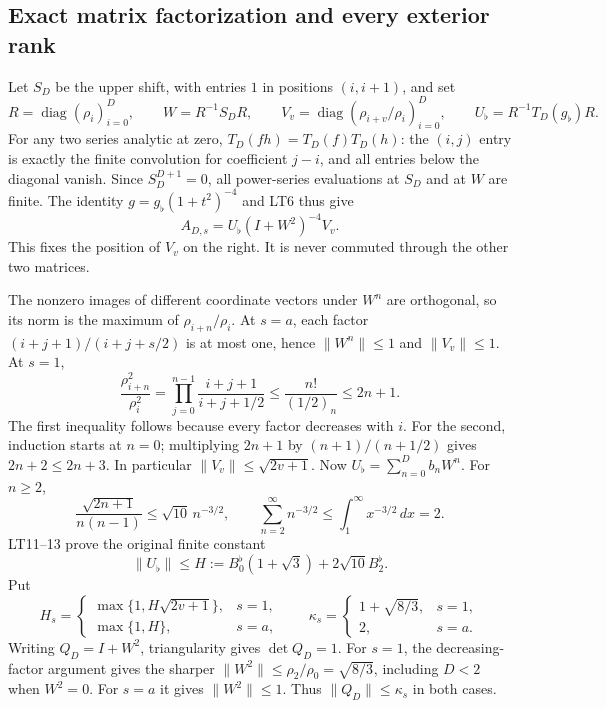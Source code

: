 \documentclass[11pt,a4paper]{article}
\begin{document}
\subsection{Exact matrix factorization and every exterior rank}

Let $S_D$ be the upper shift, with entries $1$ in positions $(i,i+1)$,
and set
\[
 R=\operatorname{diag}(\rho_i)_{i=0}^D,\qquad
 W=R^{-1}S_DR,\qquad V_v=\operatorname{diag}(\rho_{i+v}/\rho_i)_{i=0}^D,
 \qquad U_\flat=R^{-1}T_D(g_\flat)R .                    \tag{LT12}
\]
For any two series analytic at zero, $T_D(fh)=T_D(f)T_D(h)$:
the $(i,j)$ entry is exactly the finite convolution for coefficient
$j-i$, and all entries below the diagonal vanish. Since $S_D^{D+1}=0$,
all power-series evaluations at $S_D$ and at $W$ are finite.
The identity $g=g_\flat(1+t^2)^{-4}$ and LT6 thus give
\[
 \boxed{A_{D,s}=U_\flat(I+W^2)^{-4}V_v.}                 \tag{LRC7}
\]
This fixes the position of $V_v$ on the right. It is never commuted
through the other two matrices.

The nonzero images of different coordinate vectors under $W^n$ are
orthogonal, so its norm is the maximum of $\rho_{i+n}/\rho_i$.
At $s=a$, each factor $(i+j+1)/(i+j+s/2)$ is at most one, hence
$\|W^n\|\le1$ and $\|V_v\|\le1$. At $s=1$,
\[
 \frac{\rho_{i+n}^2}{\rho_i^2}
 =\prod_{j=0}^{n-1}\frac{i+j+1}{i+j+1/2}
 \le\frac{n!}{(1/2)_n}\le2n+1.                         \tag{LT13}
\]
The first inequality follows because every factor decreases with $i$.
For the second, induction starts at $n=0$; multiplying $2n+1$ by
$(n+1)/(n+1/2)$ gives $2n+2\le2n+3$.
In particular $\|V_v\|\le\sqrt{2v+1}$.
Now $U_\flat=\sum_{n=0}^D b_nW^n$. For $n\ge2$,
\[
 \frac{\sqrt{2n+1}}{n(n-1)}\le\sqrt{10}\,n^{-3/2},\qquad
 \sum_{n=2}^\infty n^{-3/2}
 \le\int_1^\infty x^{-3/2}\,dx=2.
\]
LT11--13 prove the original finite constant
\[
 \|U_\flat\|\le H:=B_0^{\flat}(1+\sqrt3)+2\sqrt{10}B_2^{\flat}.
                                                               \tag{LT14}
\]
Put
\[
 H_s=\begin{cases}\max\{1,H\sqrt{2v+1}\},&s=1,\\
                  \max\{1,H\},&s=a,\end{cases}
 \qquad
 \kappa_s=\begin{cases}1+\sqrt{8/3},&s=1,\\2,&s=a.\end{cases}
                                                               \tag{LT15}
\]
Writing $Q_D=I+W^2$, triangularity gives $\det Q_D=1$.
For $s=1$, the decreasing-factor argument gives the sharper
$\|W^2\|\le\rho_2/\rho_0=\sqrt{8/3}$, including $D<2$ when
$W^2=0$. For $s=a$ it gives $\|W^2\|\le1$.
Thus $\|Q_D\|\le\kappa_s$ in both cases.
\end{document}
